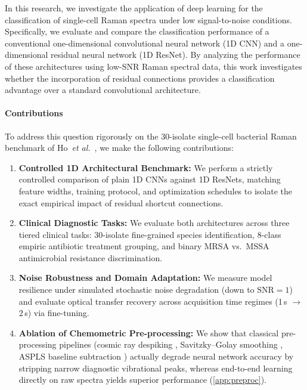 \documentclass[journal,onecolumn]{IEEEtran}
\newcommand{\sunit}[1]{#1\,s}             %
\begin{document}
In this research, we investigate the application of deep learning for the
classification of single-cell Raman spectra under low signal-to-noise
conditions. Specifically, we evaluate and compare the classification
performance of a conventional one-dimensional convolutional neural network (1D
CNN) and a one-dimensional residual neural network (1D ResNet). By analyzing
the performance of these architectures using low-SNR Raman spectral data, this
work investigates whether the incorporation of residual connections provides a
classification advantage over a standard convolutional architecture.

\paragraph*{Contributions}
To address this question rigorously on the 30-isolate single-cell bacterial
Raman benchmark of Ho~\textit{et al.}~\cite{ho2019rapid}, we make the
following contributions:
\begin{enumerate}
  \item \textbf{Controlled 1D Architectural Benchmark:} We perform a strictly
        controlled comparison of plain 1D CNNs against 1D ResNets, matching
        feature widths, training protocol, and optimization schedules to isolate
        the exact empirical impact of residual shortcut connections.
  \item \textbf{Clinical Diagnostic Tasks:} We evaluate both architectures
        across three tiered clinical tasks: 30-isolate fine-grained species
        identification, 8-class empiric antibiotic treatment grouping, and
        binary MRSA vs.\ MSSA antimicrobial resistance discrimination.
  \item \textbf{Noise Robustness and Domain Adaptation:} We measure model
        resilience under simulated stochastic noise degradation (down to
        $\mathrm{SNR}=1$) and evaluate optical transfer recovery across
        acquisition time regimes (\sunit{1} $\rightarrow$ \sunit{2}) via
        fine-tuning.
  \item \textbf{Ablation of Chemometric Pre-processing:} We show that classical
        pre-processing pipelines (cosmic ray despiking \cite{whitaker2018simple}, Savitzky--Golay
        smoothing \cite{savitzky1964smoothing}, ASPLS baseline subtraction \cite{zhang2020baseline}) actually degrade neural network
        accuracy by stripping narrow diagnostic vibrational peaks, whereas
        end-to-end learning directly on raw spectra yields superior performance
        (\cref{app:preproc}).
\end{enumerate}
\end{document}
